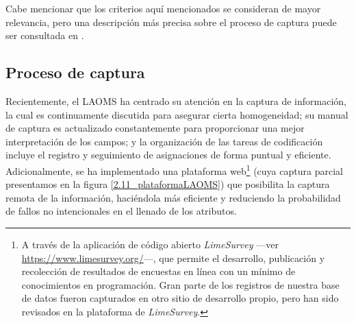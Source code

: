 \documentclass[letterpaper, 11pt]{book}
\theoremstyle{definition}
\theoremstyle{remark}
\begin{document}
Cabe mencionar que los criterios aquí mencionados se consideran de mayor relevancia, pero una descripción más precisa sobre el proceso de captura puede ser consultada en \citet{2017_Cadena_ManualLAOMS}.



\subsection{Proceso de captura}
\label{sec:captura}

Recientemente, el LAOMS ha centrado su atención en la captura de información, la cual es continuamente discutida para asegurar cierta homogeneidad; su manual de captura es actualizado constantemente para proporcionar una mejor interpretación de los campos; 
y la organización de las tareas de codificación incluye el registro y seguimiento de asignaciones de forma puntual y eficiente. 
Adicionalmente, se ha implementado una plataforma web\footnote{
    A través de la aplicación de código abierto \emph{LimeSurvey} ---ver \url{https://www.limesurvey.org/}---, que permite el desarrollo, publicación y recolección de resultados de encuestas en línea con un mínimo de conocimientos en programación.
    Gran parte de los registros de nuestra base de datos fueron capturados en otro sitio de desarrollo propio, pero han sido revisados en la plataforma de \emph{LimeSurvey}. 
} 
(cuya captura parcial presentamos en la figura \ref{2.11_plataformaLAOMS}) que posibilita la captura remota de la información, haciéndola más eficiente y reduciendo la probabilidad de fallos no intencionales en el llenado de los atributos. 
\end{document}
